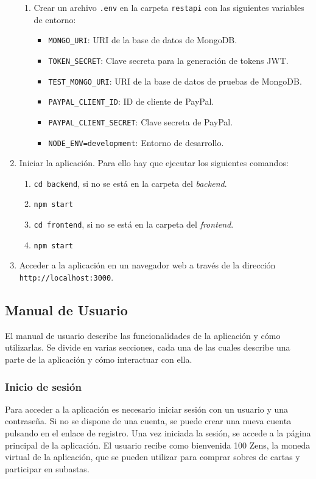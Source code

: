 \begin{enumerate}
    \begin{enumerate}
        \item Crear un archivo \texttt{.env} en la carpeta \texttt{restapi} con las siguientes variables de entorno:
        \begin{itemize}
            \item \texttt{MONGO\_URI}: URI de la base de datos de MongoDB.
            \item \texttt{TOKEN\_SECRET}: Clave secreta para la generación de tokens JWT.
            \item \texttt{TEST\_MONGO\_URI}: URI de la base de datos de pruebas de MongoDB.
            \item \texttt{PAYPAL\_CLIENT\_ID}: ID de cliente de PayPal.
            \item \texttt{PAYPAL\_CLIENT\_SECRET}: Clave secreta de PayPal.
            \item \texttt{NODE\_ENV=development}: Entorno de desarrollo.
        \end{itemize}
    \end{enumerate}
    \item Iniciar la aplicación. Para ello hay que ejecutar los siguientes comandos:
    \begin{enumerate}
        \item \texttt{cd backend}, si no se está en la carpeta del \textit{backend}.
        \item \texttt{npm start}
        \item \texttt{cd frontend}, si no se está en la carpeta del \textit{frontend}.
        \item \texttt{npm start}
    \end{enumerate}
    \item Acceder a la aplicación en un navegador web a través de la dirección \texttt{http://localhost:3000}.
\end{enumerate}



\subsection{Manual de Usuario} 
El manual de usuario describe las funcionalidades de la aplicación y cómo utilizarlas.
Se divide en varias secciones, cada una de las cuales describe una parte de la aplicación y cómo interactuar con ella.

\subsubsection{Inicio de sesión}
Para acceder a la aplicación es necesario iniciar sesión con un usuario y una contraseña.
Si no se dispone de una cuenta, se puede crear una nueva cuenta pulsando en el enlace de registro.
Una vez iniciada la sesión, se accede a la página principal de la aplicación.
El usuario recibe como bienvenida 100 Zens, la moneda virtual de la aplicación, que se pueden utilizar para comprar sobres de cartas
y participar en subastas.

